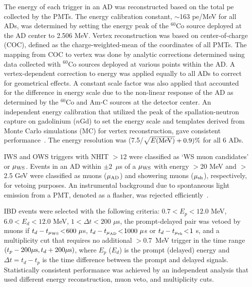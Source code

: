 \documentclass[aps,prl,showpacs,showkeys,amsmath,amssymb,
twocolumn,
floatfix,
superscriptaddress
]{revtex4-1}
\begin{document}
\par
The energy of each trigger in an AD was reconstructed based on the total pe collected by the PMTs.  The energy calibration constant, $\sim$163 pe/MeV for all ADs, was
determined by setting the energy peak of the $^{60}$Co source deployed at the AD
center to 2.506 MeV\@.  Vertex reconstruction was based on
center-of-charge (COC), defined as the charge-weighted-mean of the
coordinates of all PMTs. The mapping from COC to vertex was done by
analytic corrections determined using data collected with $^{60}$Co sources deployed at various points within the AD\@.
A vertex-dependent correction to energy was applied equally to all ADs to correct for geometrical effects.
A constant scale factor was also applied that accounted for the difference in energy scale due to the non-linear response of the AD as determined by the $^{60}$Co and Am-C sources at the detector center.
An independent energy calibration that utilized the peak of the spallation-neutron capture on gadolinium ($n$Gd) to set the energy scale and templates derived from Monte Carlo simulations (MC) for vertex
reconstruction, gave consistent performance~\cite{ad12}. The energy resolution was
(7.5/$\sqrt{E({\rm MeV})}+0.9)\%$ for all 6 ADs.

\par
IWS and OWS triggers with NHIT $>\!12$ were
classified as `WS muon candidates' or $\mu_{\rm WS}$.  Events in an AD within $\pm2$~$\mu$s of a $\mu_{\rm WS}$ with energy $>$20 MeV and $>$2.5 GeV were classified as muons ($\mu_{\rm AD}$) and showering muons ($\mu_{\rm sh}$), respectively, for vetoing purposes.
An instrumental background due to spontaneous light
emission from a PMT, denoted as a flasher, was rejected efficiently~\cite{ad12}.

\par
IBD events were selected with the following criteria:
 $0.7 \!<\! E_p \!<\! 12.0$ MeV,
 $6.0 \!<\! E_d \!<\! 12.0$ MeV,
 $1   \!<\! \Delta t \!<\! 200$ $\mu$s,
 the prompt-delayed pair was vetoed by muons if $t_d - t_{\mu_{\rm WS}} \!<\! 600\ \mu$s,
$t_d - t_{\mu_{\rm AD}} \!<\! 1000\ \mu$s or $t_d - t_{\mu_{\rm sh}} \!<\! 1$ s,
and
 a multiplicity cut that requires no additional $>$0.7~MeV trigger in the time range
$(t_p-200\mu{\rm s}, t_d+200\mu{\rm s})$,
where $E_p$ ($E_d$) is the prompt (delayed)
energy and $\Delta t = t_d - t_p$ is the time
difference between the prompt and delayed signals.
Statistically consistent performance was achieved by an independent analysis that used
different energy reconstruction, muon veto, and multiplicity cuts.
\end{document}
